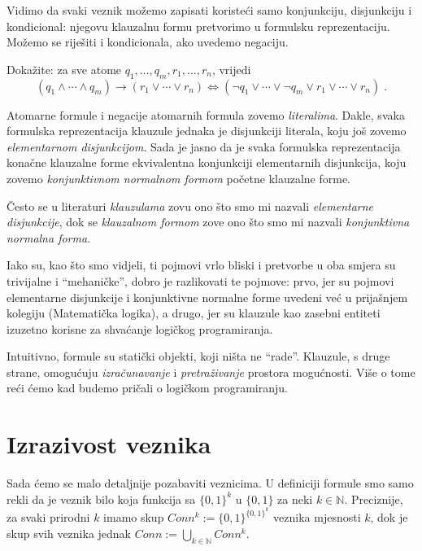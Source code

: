 Vidimo da svaki veznik možemo zapisati koristeći samo konjunkciju, disjunkciju i kondicional: njegovu klauzalnu formu pretvorimo u formulsku reprezentaciju. Možemo se riješiti i kondicionala, ako uvedemo negaciju.

\begin{zadatak}\label{zad:clfcnf}
	Dokažite: za sve atome $q_1,\ldots,q_m,r_1,\ldots,r_n$, vrijedi
	$$(q_1\wedge\cdots\wedge q_m)\to(r_1\vee\cdots\vee r_n)
	\Longleftrightarrow
	(\neg q_1\vee\cdots\vee\neg q_m\vee r_1\vee\cdots\vee r_n)\;.
	$$
\end{zadatak}

\begin{definicija}
	Atomarne formule i negacije atomarnih formula zovemo \emph{literalima}.
	Dakle, svaka formulska reprezentacija klauzule jednaka je disjunkciji literala, koju još zovemo \emph{elementarnom disjunkcijom}. Sada je jasno da je svaka formulska reprezentacija konačne klauzalne forme ekvivalentna konjunkciji elementarnih disjunkcija, koju zovemo \emph{konjunktivnom normalnom formom} početne klauzalne forme.
\end{definicija}

\begin{napomena}
	Često se u literaturi \emph{klauzulama} zovu ono što smo mi nazvali \emph{elementarne disjunkcije}, dok se \emph{klauzalnom formom} zove ono što smo mi nazvali \emph{konjunktivna normalna forma}. 
	
	Iako su, kao što smo vidjeli, ti pojmovi vrlo bliski i pretvorbe u oba smjera su trivijalne i \enquote{mehaničke}, dobro je razlikovati te pojmove: prvo, jer su pojmovi elementarne disjunkcije i konjunktivne normalne forme uvedeni već u prijašnjem kolegiju (Matematička logika), a drugo, jer su klauzule kao zasebni entiteti izuzetno korisne za shvaćanje logičkog programiranja.
	
	Intuitivno, formule su statički objekti, koji ništa ne \enquote{rade}. Klauzule, s druge strane, omogućuju \emph{izračunavanje} i \emph{pretraživanje} prostora mogućnosti. Više o tome reći ćemo kad budemo pričali o logičkom programiranju.
\end{napomena}

\section{Izrazivost veznika}
Sada ćemo se malo detaljnije pozabaviti veznicima. U definiciji formule smo samo rekli da je veznik bilo koja funkcija sa $\{0,1\}^k$ u $\{0,1\}$ za neki $k\in\mathbb N$. Preciznije, za svaki prirodni $k$ imamo skup $Conn^k:=\{0,1\}^{\{0,1\}^k}$ veznika mjesnosti $k$, dok je skup svih veznika jednak $Conn:=\bigcup_{k\in\mathbb N}Conn^k$.

